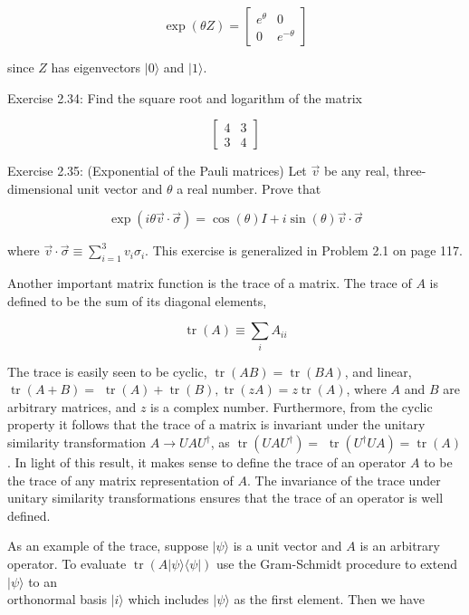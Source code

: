 \documentclass[
	11pt, %
	fleqn, %
	a4paper, %
]{LegrandOrangeBook}
\begin{document}
$$
\exp (\theta Z)=\left[\begin{array}{cc}
e^{\theta} & 0 \\
0 & e^{-\theta}
\end{array}\right]
$$

since $Z$ has eigenvectors $|0\rangle$ and $|1\rangle$.

Exercise 2.34: Find the square root and logarithm of the matrix

$$
\left[\begin{array}{ll}
4 & 3 \\
3 & 4
\end{array}\right]
$$

Exercise 2.35: (Exponential of the Pauli matrices) Let $\vec{v}$ be any real, three-dimensional unit vector and $\theta$ a real number. Prove that

$$
\exp (i \theta \vec{v} \cdot \vec{\sigma})=\cos (\theta) I+i \sin (\theta) \vec{v} \cdot \vec{\sigma}
$$

where $\vec{v} \cdot \vec{\sigma} \equiv \sum_{i=1}^{3} v_{i} \sigma_{i}$. This exercise is generalized in Problem 2.1 on page 117.

Another important matrix function is the trace of a matrix. The trace of $A$ is defined to be the sum of its diagonal elements,

$$
\operatorname{tr}(A) \equiv \sum_{i} A_{i i}
$$

The trace is easily seen to be cyclic, $\operatorname{tr}(A B)=\operatorname{tr}(B A)$, and linear, $\operatorname{tr}(A+B)=$ $\operatorname{tr}(A)+\operatorname{tr}(B), \operatorname{tr}(z A)=z \operatorname{tr}(A)$, where $A$ and $B$ are arbitrary matrices, and $z$ is a complex number. Furthermore, from the cyclic property it follows that the trace of a matrix is invariant under the unitary similarity transformation $A \rightarrow U A U^{\dagger}$, as $\operatorname{tr}\left(U A U^{\dagger}\right)=$ $\operatorname{tr}\left(U^{\dagger} U A\right)=\operatorname{tr}(A)$. In light of this result, it makes sense to define the trace of an operator $A$ to be the trace of any matrix representation of $A$. The invariance of the trace under unitary similarity transformations ensures that the trace of an operator is well defined.

As an example of the trace, suppose $|\psi\rangle$ is a unit vector and $A$ is an arbitrary operator. To evaluate $\operatorname{tr}(A|\psi\rangle\langle\psi|)$ use the Gram-Schmidt procedure to extend $|\psi\rangle$ to an\\
orthonormal basis $|i\rangle$ which includes $|\psi\rangle$ as the first element. Then we have
\end{document}
